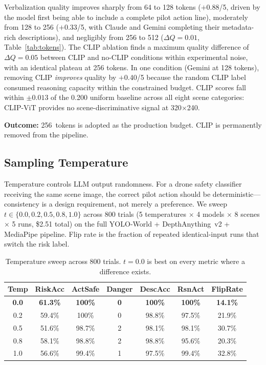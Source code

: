 \documentclass[journal]{IEEEtran}
\begin{document}
Verbalization quality improves sharply from 64 to 128 tokens
($+$0.88/5, driven by the model first being able to include a complete
pilot action line), moderately from 128 to 256 ($+$0.33/5, with Claude
and Gemini completing their metadata-rich descriptions), and negligibly
from 256 to 512 ($\Delta Q = 0.01$, Table~\ref{tab:tokens}).
The CLIP ablation finds a maximum quality difference of $\Delta Q = 0.05$
between CLIP and no-CLIP conditions within experimental noise, with an
identical plateau at 256 tokens.
In one condition (Gemini at 128 tokens), removing CLIP \emph{improves}
quality by $+$0.40/5 because the random CLIP label consumed reasoning
capacity within the constrained budget.
CLIP scores fall within $\pm0.013$ of the 0.200 uniform baseline across all
eight scene categories: CLIP-ViT provides no scene-discriminative signal at
320$\times$240.

\textbf{Outcome:} 256~tokens is adopted as the production budget.
CLIP is permanently removed from the pipeline.

\subsection{Sampling Temperature}
\label{sec:v_temperature}

Temperature controls LLM output randomness.
For a drone safety classifier receiving the same scene image, the correct
pilot action should be deterministic---consistency is a design requirement,
not merely a preference.
We sweep $t \in \{0.0, 0.2, 0.5, 0.8, 1.0\}$ across 800 trials
(5 temperatures $\times$ 4 models $\times$ 8 scenes $\times$ 5 runs,
\$2.51 total) on the full YOLO-World + DepthAnything~v2 + MediaPipe
pipeline.
Flip rate is the fraction of repeated identical-input runs that switch
the risk label.

\begin{table}[!t]
  \caption{Temperature sweep across 800 trials. $t=0.0$ is best on every
           metric where a difference exists.}
  \label{tab:temperature}
  \centering
  \small
  \begin{tabular}{ccccccc}
    \toprule
    Temp & RiskAcc & ActSafe & Danger & DescAcc & RsnAct & FlipRate \\
    \midrule
    \textbf{0.0} & \textbf{61.3\%} & \textbf{100\%} & \textbf{0} & \textbf{100\%} & \textbf{100\%} & \textbf{14.1\%} \\
    0.2          & 59.4\%          & 100\%          & 0          & 98.8\%         & 97.5\%         & 21.9\% \\
    0.5          & 51.6\%          & 98.7\%         & 2          & 98.1\%         & 98.1\%         & 30.7\% \\
    0.8          & 58.1\%          & 98.8\%         & 2          & 98.8\%         & 95.6\%         & 20.3\% \\
    1.0          & 56.6\%          & 99.4\%         & 1          & 97.5\%         & 99.4\%         & 32.8\% \\
    \bottomrule
  \end{tabular}
\end{table}
\end{document}
